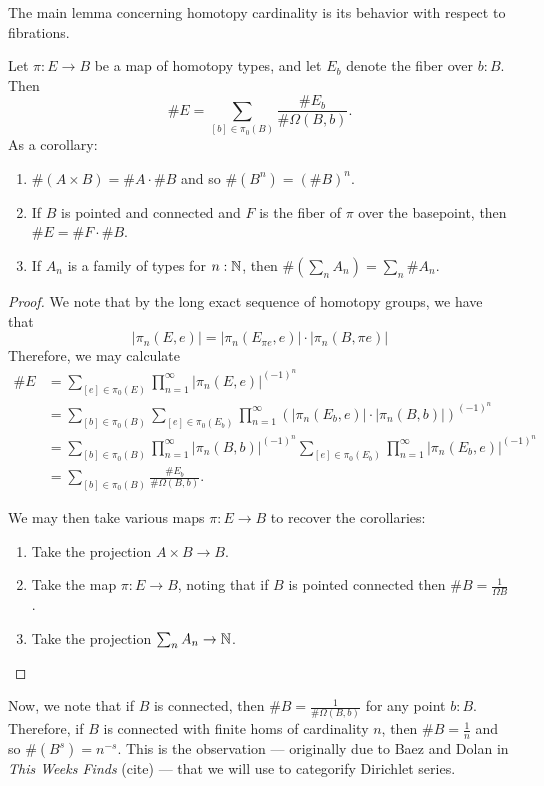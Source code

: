 The main lemma concerning homotopy cardinality is its behavior with respect to
fibrations.
\begin{lem}
Let $\pi : E \to B$ be a map of homotopy types, and let $E_b$ denote the fiber
over $b : B$. Then
$$\#E = \sum_{[b] \in \pi_0(B)}\frac{\#E_b}{\#\Omega(B, b)}.$$
As a corollary:
\begin{enumerate}
\item $\#(A \times B) = \#A \cdot \#B$ and so $\#(B^n) = (\#B)^n$.
\item If $B$ is pointed and connected and $F$ is the fiber of $\pi$ over the
  basepoint, then $\#E = \#F \cdot \#B$.
\item If $A_n$ is a family of types for $n : \operatorname{\mathbb{N}}$, then $\#(\sum_n A_n) = \sum_n \#A_n$.
\end{enumerate}
\end{lem}
\begin{proof}
  We note that by the long exact sequence of homotopy groups, we have that
  $$|\pi_n(E, e)| = |\pi_n(E_{\pi e}, e)|\cdot |\pi_n(B, \pi e)|$$
  Therefore, we may calculate
  \begin{align*}
    \#E &= \sum_{[e] \in \pi_0(E)}\prod_{n=1}^{\infty} |\pi_n(E, e)|^{(-1)^n}\\
    &= \sum_{[b] \in \pi_0(B)} \sum_{[e] \in \pi_0(E_b)} \prod_{n=1}^{\infty} (|\pi_n(E_{b}, e)|\cdot |\pi_n(B, b)|)^{(-1)^n}\\
    &= \sum_{[b] \in \pi_0(B)}\prod_{n=1}^{\infty} |\pi_n(B, b)|^{(-1)^n} \sum_{[e] \in \pi_0(E_b)} \prod_{n=1}^{\infty} |\pi_n(E_{b}, e)|^{(-1)^n}\\
    &= \sum_{[b] \in \pi_0(B)}\frac{\#E_b}{\#\Omega(B, b)}.
  \end{align*}
  
  We may then take various maps $\pi : E \to B$ to recover the corollaries:
  \begin{enumerate}
  \item Take the projection $A \times B \to B$.
  \item Take the map $\pi : E \to B$, noting that if $B$ is pointed connected then $\#B =
    \frac{1}{\Omega B}$.
  \item Take the projection $\sum_n A_n \to \operatorname{\mathbb{N}}$.
  \end{enumerate}
\end{proof}

Now, we note that if $B$ is connected, then $\#B = \frac{1}{\#\Omega(B, b)}$ for
any point $b : B$. Therefore, if $B$ is connected with finite homs of
cardinality $n$, then $\#B = \frac{1}{n}$ and so $\#(B^s) = n^{-s}$. This is the
observation --- originally due to Baez and Dolan in \emph{This Weeks Finds}
(cite) --- that we will use to categorify Dirichlet series.

